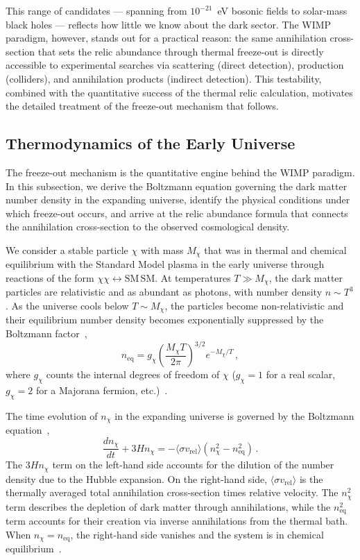 This range of candidates --- spanning from $10^{-21}$~eV bosonic fields to solar-mass black holes --- reflects how little we know about the dark sector.
The WIMP paradigm, however, stands out for a practical reason: the same annihilation cross-section that sets the relic abundance through thermal freeze-out is directly accessible to experimental searches via scattering (direct detection), production (colliders), and annihilation products (indirect detection).
This testability, combined with the quantitative success of the thermal relic calculation, motivates the detailed treatment of the freeze-out mechanism that follows.

\subsection{Thermodynamics of the Early Universe}
\label{sec:1.2.2}

The freeze-out mechanism is the quantitative engine behind the WIMP paradigm.
In this subsection, we derive the Boltzmann equation governing the dark matter number density in the expanding universe, identify the physical conditions under which freeze-out occurs, and arrive at the relic abundance formula that connects the annihilation cross-section to the observed cosmological density.

We consider a stable particle $\chi$ with mass $M_\chi$ that was in thermal and chemical equilibrium with the Standard Model plasma in the early universe through reactions of the form $\chi\chi \leftrightarrow \mathrm{SM}\,\mathrm{SM}$.
At temperatures $T \gg M_\chi$, the dark matter particles are relativistic and as abundant as photons, with number density $n \sim T^3$.
As the universe cools below $T \sim M_\chi$, the particles become non-relativistic and their equilibrium number density becomes exponentially suppressed by the Boltzmann factor~\cite{Cirelli:2024ssz},
\begin{equation}
	n_\mathrm{eq} = g_\chi \left(\frac{M_\chi T}{2\pi}\right)^{3/2} e^{-M_\chi/T} \,,
	\label{eq:n_eq}
\end{equation}
where $g_\chi$ counts the internal degrees of freedom of $\chi$ ($g_\chi = 1$ for a real scalar, $g_\chi = 2$ for a Majorana fermion, etc.)~\cite{Cirelli:2024ssz}.

The time evolution of $n_\chi$ in the expanding universe is governed by the Boltzmann equation~\cite{Cirelli:2024ssz,Gondolo:1990dk},
\begin{equation}
	\frac{dn_\chi}{dt} + 3H n_\chi = -\langle \sigma v_\mathrm{rel} \rangle \left(n_\chi^2 - n_\mathrm{eq}^2\right) \,.
	\label{eq:boltzmann}
\end{equation}
The $3Hn_\chi$ term on the left-hand side accounts for the dilution of the number density due to the Hubble expansion.
On the right-hand side, $\langle \sigma v_\mathrm{rel} \rangle$ is the thermally averaged total annihilation cross-section times relative velocity.
The $n_\chi^2$ term describes the depletion of dark matter through annihilations, while the $n_\mathrm{eq}^2$ term accounts for their creation via inverse annihilations from the thermal bath.
When $n_\chi = n_\mathrm{eq}$, the right-hand side vanishes and the system is in chemical equilibrium~\cite{Cirelli:2024ssz}.

